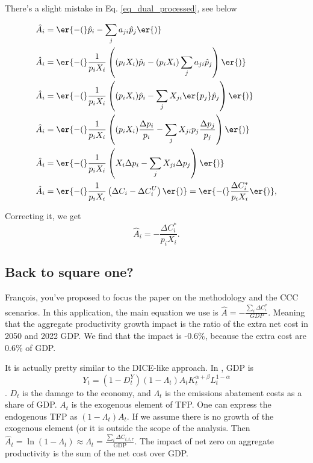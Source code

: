 \documentclass[11pt]{article}
\begin{document}
There's a slight mistake in Eq. \eqref{eq_dual_processed}, see below

\begin{align}
\hat{A}_i &= \er{-(}\hat{p}_i - \sum_j a_{ji} \hat{p}_{j}\er{)} \\
\hat{A}_i &= \er{-(}\frac{1}{p_i X_i} \left( (p_i X_i) \hat{p}_i - (p_i X_i) \sum_j a_{ji} \hat{p}_{j} \right)\er{)}\\
\hat{A}_i &= \er{-(}\frac{1}{p_i X_i} \left( (p_i X_i)\hat{p}_i - \sum_j X_{ji}\er{p_{j}} \hat{p}_{j}\right)\er{)}\\
\hat{A}_i &= \er{-(}\frac{1}{p_i X_i} \left( (p_i X_i)\frac{\Delta p_i}{p_i} - \sum_j X_{ji}p_{j} \frac{\Delta p_j}{p_j} \right)\er{)}\\
\hat{A}_i &= \er{-(}\frac{1}{p_i X_i} \left( X_i\Delta p_i - \sum_j X_{ji} \Delta p_j \right)\er{)}\\
\hat{A}_i &= \er{-(}\frac{1}{p_i X_i} \left( \Delta C_i  - \Delta C_i^{U} \right)\er{)} = \er{-(}\frac{\Delta C^*_i}{p_i X_i}\er{)},
\end{align}

Correcting it, we get
\begin{equation}
    \hat{A}_i  = -\frac{\Delta C^*_i}{p_i X_i}.
\end{equation}


\subsection{Back to square one?}

François, you've proposed to focus the paper on the methodology and the CCC scenarios. In this application, the main equation we use is $\hat{A}  = -\frac{\sum_i \Delta C^*_i}{GDP}$. Meaning that the aggregate productivity growth impact is the ratio of the extra net cost in 2050 and 2022 GDP. We find that the impact is -0.6\%, because the extra cost are 0.6\% of GDP.

It is actually pretty similar to the DICE-like approach. In \cite{dietzEndogenousGrowthConvexity2015}, GDP is 
\[
Y_t=(1-D_t^Y)(1-\Lambda_t)A_tK^{\alpha+\beta}_tL^{1-\alpha}_t
\]. $D_t$ is the damage to the economy, and $\Lambda_t$ is the emissions abatement costs as a share of GDP. $A_t$ is the exogenous element of TFP. One can express the endogenous TFP as $(1-\Lambda_t)A_t$. If we assume there is no growth of the exogenous element (or it is outside the scope of the analysis. Then $\hat{A}_t=\ln(1-\Lambda_t)\approx \Lambda_t= \frac{\sum_i \Delta C_{i,t,\tau}}{\text{GDP}}$. The impact of net zero on aggregate productivity is the sum of the net cost over GDP.
\end{document}

